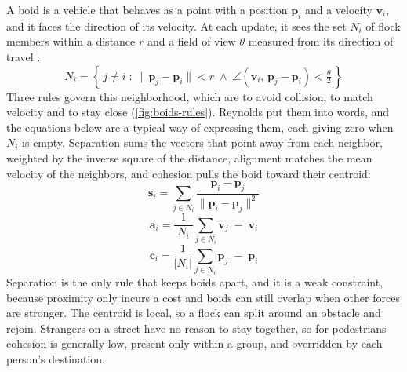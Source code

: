 A boid is a vehicle that behaves as a point with a position $\mathbf{p}_i$ and a velocity $\mathbf{v}_i$, and it faces the direction of its velocity. At each update, it sees the set $N_i$ of flock members within a distance $r$ and a field of view $\theta$ measured from its direction of travel \citep{reynolds1987flocks}:
\begin{equation}
\boxed{N_i = \left\{\, j \neq i \;:\; \lVert \mathbf{p}_j - \mathbf{p}_i \rVert < r \;\wedge\; \angle\!\left(\mathbf{v}_i,\, \mathbf{p}_j - \mathbf{p}_i\right) < \tfrac{\theta}{2} \,\right\}}
\label{eq:neighbourhood}
\end{equation}
Three rules govern this neighborhood, which are to avoid collision, to match velocity and to stay close (\cref{fig:boids-rules}). Reynolds put them into words, and the equations below are a typical way of expressing them, each giving zero when $N_i$ is empty. Separation sums the vectors that point away from each neighbor, weighted by the inverse square of the distance, alignment matches the mean velocity of the neighbors, and cohesion pulls the boid toward their centroid:
\begin{equation}
\boxed{\mathbf{s}_i = \sum_{j \in N_i} \frac{\mathbf{p}_i - \mathbf{p}_j}{\lVert \mathbf{p}_i - \mathbf{p}_j \rVert^{2}}}
\label{eq:separation}
\end{equation}
\begin{equation}
\boxed{\mathbf{a}_i = \frac{1}{\lvert N_i \rvert} \sum_{j \in N_i} \mathbf{v}_j \;-\; \mathbf{v}_i}
\label{eq:alignment}
\end{equation}
\begin{equation}
\boxed{\mathbf{c}_i = \frac{1}{\lvert N_i \rvert} \sum_{j \in N_i} \mathbf{p}_j \;-\; \mathbf{p}_i}
\label{eq:cohesion}
\end{equation}
Separation is the only rule that keeps boids apart, and it is a weak constraint, because proximity only incurs a cost and boids can still overlap when other forces are stronger. The centroid is local, so a flock can split around an obstacle and rejoin. Strangers on a street have no reason to stay together, so for pedestrians cohesion is generally low, present only within a group, and overridden by each person's destination.

